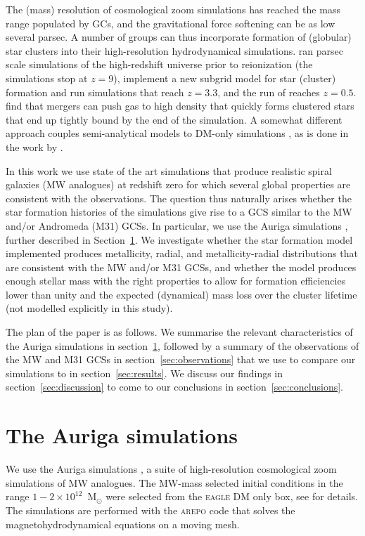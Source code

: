 \documentclass[a4paper,fleqn,usenatbib]{mnras}
\begin{document}
The (mass) resolution of cosmological zoom simulations has reached the mass range 
populated by GCs, and the gravitational force softening can be as low several 
parsec. A number of groups can thus incorporate formation of (globular) star 
clusters into their high-resolution hydrodynamical simulations. \citet{2016ApJ...831..204R} 
ran parsec scale simulations of the high-redshift universe 
prior to reionization (the simulations stop at $z=9$), \citet{2017ApJ...834...69L} 
implement a new subgrid model for star (cluster) formation and run simulations 
that reach $z=3.3$, and the run of \citet{2017MNRAS.465.3622R} reaches $z=0.5$. 
\citet{2018MNRAS.474.4232K} find that mergers can push gas to high density that
quickly forms clustered stars that end up tightly bound by the end of the 
simulation. A somewhat different approach couples semi-analytical models to DM-only
simulations \citep{2010ApJ...718.1266M,2014ApJ...796...10L,2018MNRAS.480.2343C,
2019MNRAS.486..331C,2019arXiv190505199C}, as is done in the work by 
\citet{2019MNRAS.482.4528E}.

In this work we use state of the art simulations that produce realistic spiral 
galaxies (MW analogues) at redshift zero for which several global properties 
are consistent with the observations. The question thus naturally arises whether 
the star formation histories of the simulations give rise to a GCS similar to 
the MW and/or Andromeda (M31) GCSs. In particular, 
we use the Auriga simulations \citep[][hereafter G17]{2017MNRAS.467..179G}, 
further described in Section~\ref{sec:auriga}. We investigate whether the star 
formation model implemented produces metallicity, 
radial, and metallicity-radial distributions that are consistent with the MW 
and/or M31 GCSs, and whether the model produces enough stellar mass with
the right properties to allow for formation efficiencies lower than unity and
the expected (dynamical) mass loss over the cluster lifetime (not modelled 
explicitly in this study). 

The plan of the paper is as follows. We summarise the relevant characteristics 
of the Auriga simulations in section~\ref{sec:auriga}, followed by a summary of 
the observations of the MW and M31 GCSs
in section~\ref{sec:observations} that we use to compare our simulations to in
section~\ref{sec:results}. We discuss our findings in section~\ref{sec:discussion}
to come to our conclusions in section~\ref{sec:conclusions}.


\section{The Auriga simulations}
\label{sec:auriga}
We use the Auriga simulations , a suite of 
high-resolution cosmological zoom simulations of MW analogues. The MW-mass
selected initial conditions in the range $1-2 \times 10^{12}$~M$_{\odot}$
were selected from the \mbox{\textsc{eagle}} DM only box, see 
 for details. The simulations are 
performed with the \textsc{arepo} code \citep{2010MNRAS.401..791S, 2016MNRAS.455.1134P} 
that solves the magnetohydrodynamical equations on a moving mesh. 
\end{document}
